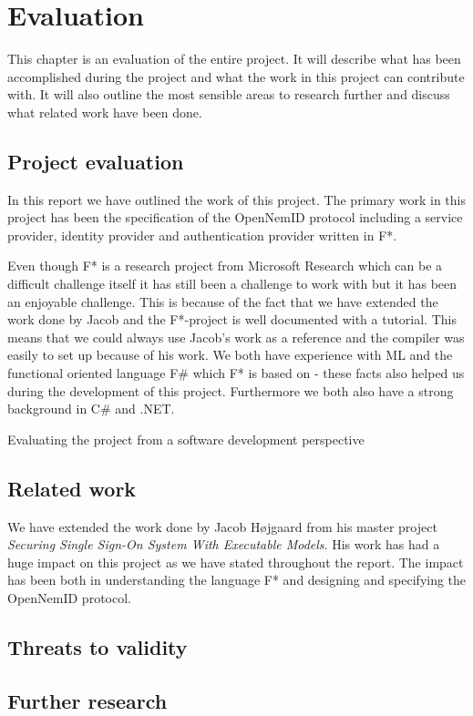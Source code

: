 \documentclass[twosided]{report}
\begin{document}
\chapter{Evaluation}
This chapter is an evaluation of the entire project. It will describe what has been accomplished during the project and what the work in this project can contribute with. It will also outline the most sensible areas to research further and discuss what related work have been done.
\section{Project evaluation}
In this report we have outlined the work of this project. The primary work in this project has been the specification of the OpenNemID protocol including a service provider, identity provider and authentication provider written in F*.
\par
Even though F* is a research project from Microsoft Research which can be a difficult challenge itself it has still been a challenge to work with but it has been an enjoyable challenge. This is because of the fact that we have extended the work done by Jacob and the F*-project is well documented with a tutorial. This means that we could always use Jacob's work as a reference and the compiler was easily to set up because of his work. We both have experience with ML and the functional oriented language F\# which F* is based on - these facts also helped us during the development of this project. Furthermore we both also have a strong background in C\# and .NET.
\par
Evaluating the project from a software development perspective
\par

\section{Related work}
We have extended the work done by Jacob H{\o}jgaard \cite{jacob} from his master project \emph{Securing Single Sign-On System With Executable Models}. His work has had a huge impact on this project as we have stated throughout the report. The impact has been both in understanding the language F* and designing and specifying the OpenNemID protocol.
\section{Threats to validity}

\section{Further research}
\end{document}
